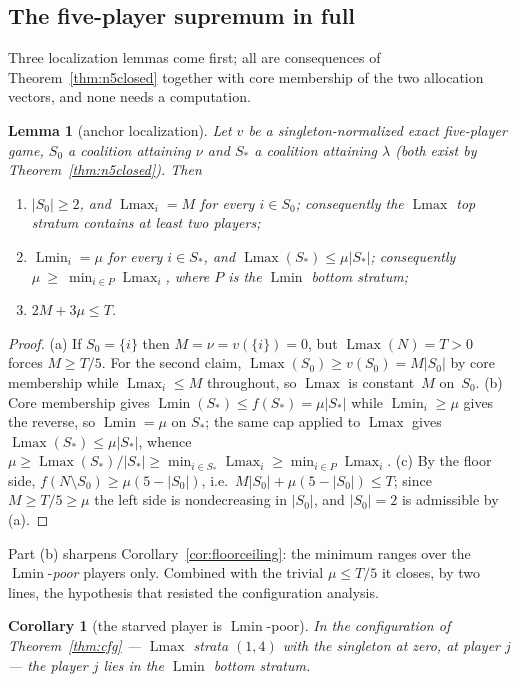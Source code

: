 \documentclass[11pt]{article}
\newtheorem{lemma}[theorem]{Lemma}
\newtheorem{corollary}[theorem]{Corollary}
\newcommand{\Lmin}{\operatorname{Lmin}}
\newcommand{\Lmax}{\operatorname{Lmax}}
\begin{document}
\subsection{The five-player supremum in full}\label{sec:s5full}

Three localization lemmas come first; all are consequences of
Theorem~\ref{thm:n5closed} together with core membership of the two
allocation vectors, and none needs a computation.

\begin{lemma}[anchor localization]\label{lem:anchors}
Let $v$ be a singleton-normalized exact five-player game, $S_0$ a coalition
attaining $\nu$ and $S_*$ a coalition attaining $\lambda$ (both exist by
Theorem~\ref{thm:n5closed}).  Then
\begin{enumerate}[nosep,label=(\alph*)]
\item $|S_0|\ge2$, and $\Lmax_i=M$ for every $i\in S_0$; consequently the
      $\Lmax$ top stratum contains at least two players;
\item $\Lmin_i=\mu$ for every $i\in S_*$, and $\Lmax(S_*)\le\mu|S_*|$;
      consequently
      $\mu\ \ge\ \min_{i\in P}\Lmax_i$, where $P$ is the $\Lmin$ bottom
      stratum;
\item $2M+3\mu\le T$.
\end{enumerate}
\end{lemma}

\begin{proof}
(a) If $S_0=\{i\}$ then $M=\nu=v(\{i\})=0$, but $\Lmax(N)=T>0$ forces
$M\ge T/5$.  For the second claim, $\Lmax(S_0)\ge v(S_0)=M|S_0|$ by core
membership while $\Lmax_i\le M$ throughout, so $\Lmax$ is constant~$M$
on~$S_0$.
(b) Core membership gives $\Lmin(S_*)\le f(S_*)=\mu|S_*|$ while
$\Lmin_i\ge\mu$ gives the reverse, so $\Lmin=\mu$ on $S_*$; the same cap
applied to $\Lmax$ gives $\Lmax(S_*)\le\mu|S_*|$, whence
$\mu\ge\Lmax(S_*)/|S_*|\ge\min_{i\in S_*}\Lmax_i\ge\min_{i\in P}\Lmax_i$.
(c) By the floor side, $f(N\setminus S_0)\ge\mu(5-|S_0|)$, i.e.\
$M|S_0|+\mu(5-|S_0|)\le T$; since $M\ge T/5\ge\mu$ the left side is
nondecreasing in $|S_0|$, and $|S_0|=2$ is admissible by (a).
\end{proof}

Part (b) sharpens Corollary~\ref{cor:floorceiling}: the minimum ranges over
the $\Lmin$-\emph{poor} players only.  Combined with the trivial
$\mu\le T/5$ it closes, by two lines, the hypothesis that resisted the
configuration analysis.

\begin{corollary}[the starved player is $\Lmin$-poor]\label{cor:poorstarved}
In the configuration of Theorem~\ref{thm:cfg} --- $\Lmax$ strata $(1,4)$
with the singleton at zero, at player $j$ --- the player $j$ lies in the
$\Lmin$ bottom stratum.
\end{corollary}
\end{document}
